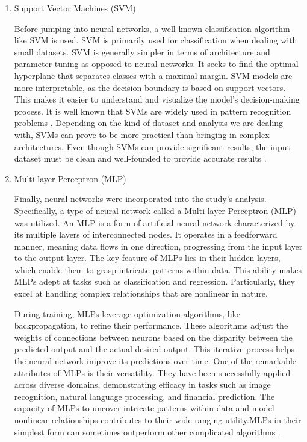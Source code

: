\documentclass[12pt]{article}
\begin{document}
\begin{enumerate}
\item Support Vector Machines (SVM)

Before jumping into neural networks, a well-known classification algorithm like SVM is used. SVM is primarily used for classification when dealing with small datasets. SVM is generally simpler in terms of architecture and parameter tuning as opposed to neural networks. It seeks to find the optimal hyperplane that separates classes with a maximal margin. SVM models are more interpretable, as the decision boundary is based on support vectors. This makes it easier to understand and visualize the model's decision-making process.
It is well known that SVMs are widely used in pattern recognition problems \citep{osareh2002comparative}. Depending on the kind of dataset and analysis we are dealing with, SVMs can prove to be more practical than bringing in complex architectures. Even though SVMs can provide significant results, the input dataset must be clean and well-founded to provide accurate results \citep{yeh2010hybrid}.

\item Multi-layer Perceptron (MLP)

Finally, neural networks were incorporated into the study's analysis. Specifically, a type of neural network called a Multi-layer Perceptron (MLP) was utilized. An MLP is a form of artificial neural network characterized by its multiple layers of interconnected nodes. It operates in a feedforward manner, meaning data flows in one direction, progressing from the input layer to the output layer. The key feature of MLPs lies in their hidden layers, which enable them to grasp intricate patterns within data. This ability makes MLPs adept at tasks such as classification and regression. Particularly, they excel at handling complex relationships that are nonlinear in nature.

During training, MLPs leverage optimization algorithms, like backpropagation, to refine their performance. These algorithms adjust the weights of connections between neurons based on the disparity between the predicted output and the actual desired output. This iterative process helps the neural network improve its predictions over time. One of the remarkable attributes of MLPs is their versatility. They have been successfully applied across diverse domains, demonstrating efficacy in tasks such as image recognition, natural language processing, and financial prediction. The capacity of MLPs to uncover intricate patterns within data and model nonlinear relationships contributes to their wide-ranging utility.MLPs in their simplest form can sometimes outperform other complicated algorithms \citep{venugopal2021comparison}.

\end{enumerate}
\end{document}
